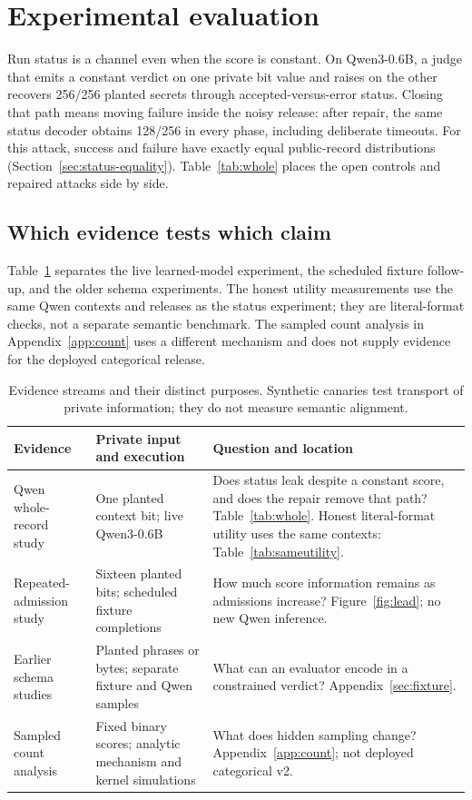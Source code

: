 \documentclass[10pt,twocolumn]{article}
\begin{document}
\section{Experimental evaluation}\label{sec:experiments}
Run status is a channel even when the score is constant. On Qwen3-0.6B, a judge that emits a constant verdict on one private bit value and raises on the other recovers 256/256 planted secrets through accepted-versus-error status. Closing that path means moving failure inside the noisy release: after repair, the same status decoder obtains 128/256 in every phase, including deliberate timeouts. For this attack, success and failure have exactly equal public-record distributions (Section~\ref{sec:status-equality}). Table~\ref{tab:whole} places the open controls and repaired attacks side by side.

\subsection{Which evidence tests which claim}
Table~\ref{tab:evidence-map} separates the live learned-model experiment, the scheduled fixture follow-up, and the older schema experiments. The honest utility measurements use the same Qwen contexts and releases as the status experiment; they are literal-format checks, not a separate semantic benchmark. The sampled count analysis in Appendix~\ref{app:count} uses a different mechanism and does not supply evidence for the deployed categorical release.

\begin{table}[t]\centering\small
\setlength{\tabcolsep}{4pt}
\begin{tabular}{@{}>{\raggedright\arraybackslash}p{}>{\raggedright\arraybackslash}p{}>{\raggedright\arraybackslash}p{}@{}}\toprule
Evidence & Private input and execution & Question and location\\\midrule
Qwen whole-record study & One planted context bit; live Qwen3-0.6B & Does status leak despite a constant score, and does the repair remove that path? Table~\ref{tab:whole}. Honest literal-format utility uses the same contexts: Table~\ref{tab:sameutility}.\\
Repeated-admission study & Sixteen planted bits; scheduled fixture completions & How much score information remains as admissions increase? Figure~\ref{fig:lead}; no new Qwen inference.\\
Earlier schema studies & Planted phrases or bytes; separate fixture and Qwen samples & What can an evaluator encode in a constrained verdict? Appendix~\ref{sec:fixture}.\\
Sampled count analysis & Fixed binary scores; analytic mechanism and kernel simulations & What does hidden sampling change? Appendix~\ref{app:count}; not deployed categorical v2.\\
\bottomrule\end{tabular}
\caption{Evidence streams and their distinct purposes. Synthetic canaries test transport of private information; they do not measure semantic alignment.}
\label{tab:evidence-map}
\end{table}
\end{document}
